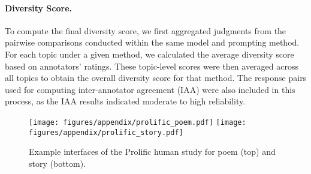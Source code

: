 \paragraph{Diversity Score.}
To compute the final diversity score, we first aggregated judgments from the pairwise comparisons conducted within the same model and prompting method. For each topic under a given method, we calculated the average diversity score based on annotators' ratings. These topic-level scores were then averaged across all topics to obtain the overall diversity score for that method. The response pairs used for computing inter-annotator agreement (IAA) were also included in this process,
as the IAA results indicated moderate to high reliability.


\begin{figure}[ht]
    \centering
    \texttt{[image: figures/appendix/prolific\_poem.pdf]}
    \texttt{[image: figures/appendix/prolific\_story.pdf]}\\[1em]
    \caption{Example interfaces of the Prolific human study for poem (top) and story (bottom).}
    \label{fig:prolific_results}
\end{figure}
